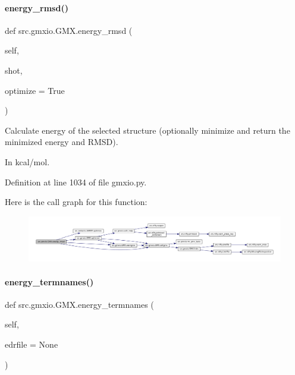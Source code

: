 \paragraph{\texorpdfstring{energy\+\_\+rmsd()}{energy\_rmsd()}}
{\footnotesize\ttfamily def src.\+gmxio.\+G\+M\+X.\+energy\+\_\+rmsd (\begin{DoxyParamCaption}\item[{}]{self,  }\item[{}]{shot,  }\item[{}]{optimize = {\ttfamily True} }\end{DoxyParamCaption})}



Calculate energy of the selected structure (optionally minimize and return the minimized energy and R\+M\+SD). 

In kcal/mol. 

Definition at line 1034 of file gmxio.\+py.

Here is the call graph for this function\+:
\nopagebreak
\begin{figure}[H]
\begin{center}
\leavevmode
\includegraphics[width=350pt]{classsrc_1_1gmxio_1_1GMX_ab545f644dac9947905b0b8c64d5f9c6d_cgraph}
\end{center}
\end{figure}
\mbox{\label{classsrc_1_1gmxio_1_1GMX_aa2907fefccf0791846d2bc87f38ef5fe}} 
\paragraph{\texorpdfstring{energy\+\_\+termnames()}{energy\_termnames()}}
{\footnotesize\ttfamily def src.\+gmxio.\+G\+M\+X.\+energy\+\_\+termnames (\begin{DoxyParamCaption}\item[{}]{self,  }\item[{}]{edrfile = {\ttfamily None} }\end{DoxyParamCaption})}



